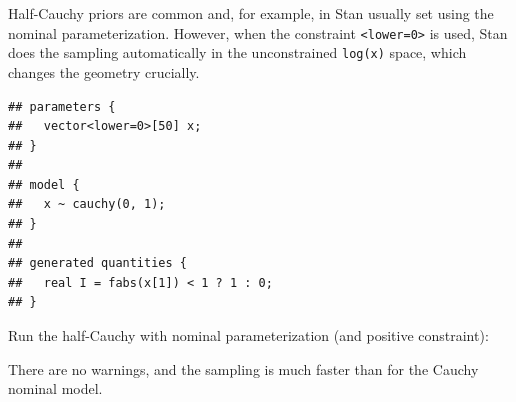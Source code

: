 \documentclass[american,]{article}
\begin{document}
Half-Cauchy priors are common and, for example, in Stan usually set
using the nominal parameterization. However, when the constraint
\texttt{\textless{}lower=0\textgreater{}} is used, Stan does the
sampling automatically in the unconstrained \texttt{log(x)} space, which
changes the geometry crucially.

\begin{verbatim}
## parameters {
##   vector<lower=0>[50] x;
## }
## 
## model {
##   x ~ cauchy(0, 1);
## }
## 
## generated quantities {
##   real I = fabs(x[1]) < 1 ? 1 : 0;
## }
\end{verbatim}

Run the half-Cauchy with nominal parameterization (and positive
constraint):

There are no warnings, and the sampling is much faster than for the
Cauchy nominal model.
\end{document}
